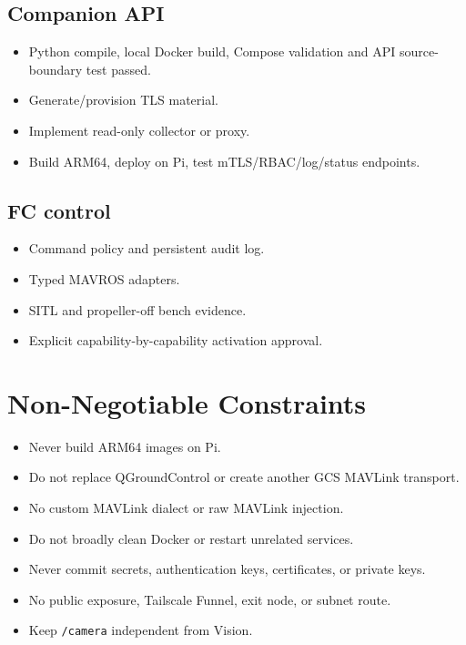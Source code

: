 \documentclass[11pt,a4paper]{article}
\newcommand{\pathtext}[1]{\texttt{#1}}
\newcommand{\todoitem}{\textcolor{red}{\textbf{[TODO]}}}
\begin{document}
\subsection{Companion API}
\begin{itemize}
  \item[$\checkmark$] Python compile, local Docker build, Compose validation and
        API source-boundary test passed.
  \item[\todoitem] Generate/provision TLS material.
  \item[\todoitem] Implement read-only collector or proxy.
  \item[\todoitem] Build ARM64, deploy on Pi, test mTLS/RBAC/log/status endpoints.
\end{itemize}

\subsection{FC control}
\begin{itemize}
  \item[\todoitem] Command policy and persistent audit log.
  \item[\todoitem] Typed MAVROS adapters.
  \item[\todoitem] SITL and propeller-off bench evidence.
  \item[\todoitem] Explicit capability-by-capability activation approval.
\end{itemize}

\section{Non-Negotiable Constraints}

\begin{itemize}
  \item Never build ARM64 images on Pi.
  \item Do not replace QGroundControl or create another GCS MAVLink transport.
  \item No custom MAVLink dialect or raw MAVLink injection.
  \item Do not broadly clean Docker or restart unrelated services.
  \item Never commit secrets, authentication keys, certificates, or private keys.
  \item No public exposure, Tailscale Funnel, exit node, or subnet route.
  \item Keep \pathtext{/camera} independent from Vision.
\end{itemize}
\end{document}

